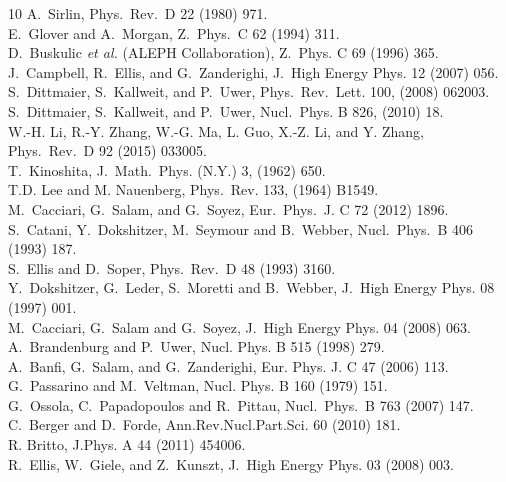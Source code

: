 \begin{thebibliography}{10}
A.~Sirlin, Phys.~Rev.~D 22 (1980) 971.
\\
E.~Glover and A.~Morgan, Z.~Phys.~C 62 (1994) 311.
\\
D.~Buskulic {\it et al.} (ALEPH Collaboration), Z.~Phys. C 69 (1996) 365.
\\
J.~Campbell, R.~Ellis, and G.~Zanderighi, J.~High Energy Phys. 12 (2007) 056.
\\
S.~Dittmaier, S.~Kallweit, and P.~Uwer, Phys.~Rev.~Lett. 100, (2008) 062003.
\\
S.~Dittmaier, S.~Kallweit, and P.~Uwer, Nucl.~Phys. B 826, (2010) 18.
\\
W.-H. Li, R.-Y. Zhang, W.-G. Ma, L. Guo, X.-Z. Li, and Y. Zhang, Phys.~Rev.~D 92 (2015) 033005.
\\
T.~Kinoshita, J.~Math.~Phys. (N.Y.) 3, (1962) 650.
\\
T.D. Lee and M. Nauenberg, Phys.~Rev. 133, (1964) B1549.
\\
M.~Cacciari, G.~Salam, and G.~Soyez, Eur.~Phys.~J. C 72 (2012) 1896.
\\
S.~Catani, Y.~Dokshitzer, M.~Seymour and B.~Webber, Nucl.~Phys.~B 406 (1993) 187.
\\
S.~Ellis and D.~Soper, Phys.~Rev.~D 48 (1993) 3160.
\\
Y.~Dokshitzer, G.~Leder, S.~Moretti and B.~Webber, J.~High Energy Phys. 08 (1997) 001.
\\
M.~Cacciari, G.~Salam and G.~Soyez, J.~High Energy Phys. 04 (2008) 063.
\\
A.~Brandenburg and P.~Uwer, Nucl. Phys. B 515 (1998) 279.
\\
A.~Banfi, G.~Salam, and G.~Zanderighi, Eur. Phys. J. C 47 (2006) 113.
\\
G.~Passarino and M.~Veltman, Nucl. Phys. B 160 (1979) 151.
\\
G.~Ossola, C.~Papadopoulos and R.~Pittau, Nucl.~Phys.~B 763 (2007) 147.
\\
C.~Berger and D.~Forde, Ann.Rev.Nucl.Part.Sci. 60 (2010) 181.
\\
R. Britto, J.Phys. A 44 (2011) 454006.
\\
R.~Ellis, W.~Giele, and Z.~Kunszt, J.~High Energy Phys. 03 (2008) 003.

\end{thebibliography}
